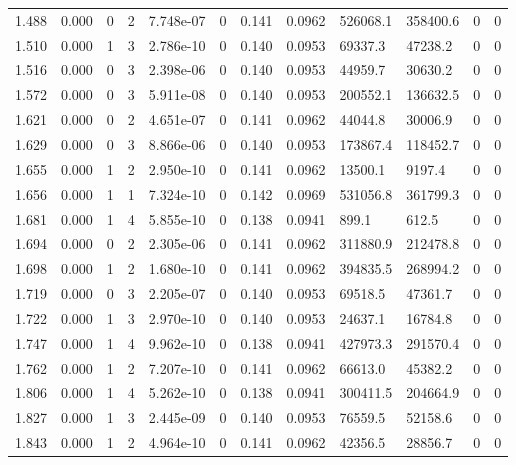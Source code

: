 \documentclass[preview]{standalone}
\begin{document}
{{{\begin{tabular}{L{1.2cm}C{1.2cm} C{0.3cm}C{0.5cm} C{1.4cm}C{1.4cm} C{1.4cm}C{1.4cm} C{1.6cm}C{1.6cm} C{1.6cm}C{1.6cm}}
  1.488  &  0.000  & 0     &  2 &  7.748e-07  & 0  &  0.141&   0.0962& 526068.1 & 358400.6   &  0 & 0  \\ 
  1.510  &  0.000  & 1     &  3 &  2.786e-10  & 0  &  0.140&   0.0953& 69337.3 & 47238.2   &  0 & 0  \\ 
  1.516  &  0.000  & 0     &  3 &  2.398e-06  & 0  &  0.140&   0.0953& 44959.7 & 30630.2   &  0 & 0  \\ 
  1.572  &  0.000  & 0     &  3 &  5.911e-08  & 0  &  0.140&   0.0953& 200552.1 & 136632.5   &  0 & 0  \\ 
  1.621  &  0.000  & 0     &  2 &  4.651e-07  & 0  &  0.141&   0.0962& 44044.8 & 30006.9   &  0 & 0  \\ 
  1.629  &  0.000  & 0     &  3 &  8.866e-06  & 0  &  0.140&   0.0953& 173867.4 & 118452.7   &  0 & 0  \\ 
  1.655  &  0.000  & 1     &  2 &  2.950e-10  & 0  &  0.141&   0.0962& 13500.1 & 9197.4   &  0 & 0  \\ 
  1.656  &  0.000  & 1     &  1 &  7.324e-10  & 0  &  0.142&   0.0969& 531056.8 & 361799.3   &  0 & 0  \\ 
  1.681  &  0.000  & 1     &  4 &  5.855e-10  & 0  &  0.138&   0.0941& 899.1 & 612.5   &  0 & 0  \\ 
  1.694  &  0.000  & 0     &  2 &  2.305e-06  & 0  &  0.141&   0.0962& 311880.9 & 212478.8   &  0 & 0  \\ 
  1.698  &  0.000  & 1     &  2 &  1.680e-10  & 0  &  0.141&   0.0962& 394835.5 & 268994.2   &  0 & 0  \\ 
  1.719  &  0.000  & 0     &  3 &  2.205e-07  & 0  &  0.140&   0.0953& 69518.5 & 47361.7   &  0 & 0  \\ 
  1.722  &  0.000  & 1     &  3 &  2.970e-10  & 0  &  0.140&   0.0953& 24637.1 & 16784.8   &  0 & 0  \\ 
  1.747  &  0.000  & 1     &  4 &  9.962e-10  & 0  &  0.138&   0.0941& 427973.3 & 291570.4   &  0 & 0  \\ 
  1.762  &  0.000  & 1     &  2 &  7.207e-10  & 0  &  0.141&   0.0962& 66613.0 & 45382.2   &  0 & 0  \\ 
  1.806  &  0.000  & 1     &  4 &  5.262e-10  & 0  &  0.138&   0.0941& 300411.5 & 204664.9   &  0 & 0  \\ 
  1.827  &  0.000  & 1     &  3 &  2.445e-09  & 0  &  0.140&   0.0953& 76559.5 & 52158.6   &  0 & 0  \\ 
  1.843  &  0.000  & 1     &  2 &  4.964e-10  & 0  &  0.141&   0.0962& 42356.5 & 28856.7   &  0 & 0  \\ 

\end{tabular}}}}
\end{document}
